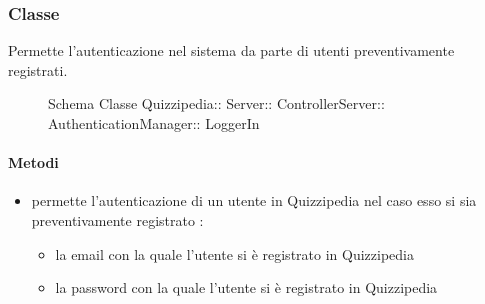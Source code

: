 \subsubsection{Classe }
Permette l'autenticazione nel sistema da parte di utenti preventivamente registrati.
\begin{figure}[H]
\centering
\noindent{}
\caption[Schema Classe LoggerIn]{Schema Classe Quizzipedia:: Server:: ControllerServer:: AuthenticationManager:: LoggerIn}
\end{figure}
\paragraph{Metodi}
\begin{itemize}
\item {}
\newline
permette l'autenticazione di un utente in Quizzipedia nel caso esso si sia preventivamente registrato
\newline
{} :
\begin{itemize}
\item {}
\newline
la email con la quale l'utente si è registrato in Quizzipedia
\item {}
\newline
la password con la quale l'utente si è registrato in Quizzipedia
\end{itemize}
\end{itemize}
